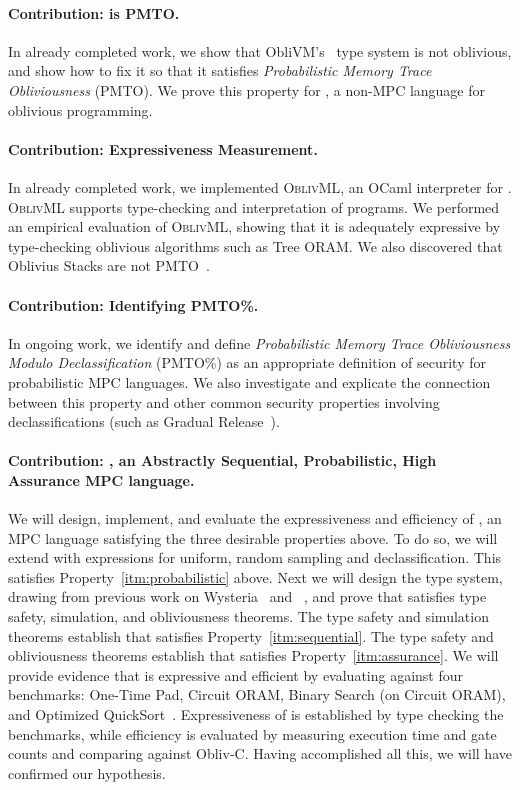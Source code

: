 \paragraph{Contribution: \obliv is PMTO.} In already completed work, we show that ObliVM's~\cite{oblivm} type system is not oblivious,
and show how to fix it so that it satisfies \emph{Probabilistic Memory Trace Obliviousness} (PMTO). We prove this property for \obliv,
a non-MPC language for oblivious programming.

\paragraph{Contribution: \obliv Expressiveness Measurement.} In already completed work, we implemented \textsc{OblivML}, an OCaml
interpreter for \obliv. \textsc{OblivML} supports type-checking and interpretation of \obliv programs. We performed an empirical
evaluation of \textsc{OblivML}, showing that it is adequately expressive by type-checking oblivious algorithms such as Tree ORAM.
We also discovered that Oblivius Stacks are not PMTO~\cite{sweet20odsnotpmto}.

\paragraph{Contribution: Identifying PMTO\%.} In ongoing work, we identify and define \emph{Probabilistic Memory Trace Obliviousness Modulo Declassification}
(PMTO\%) as an appropriate definition of security for probabilistic MPC languages. We also investigate and explicate the connection between
this property and other common security properties involving declassifications (such as Gradual Release~\cite{gradual-release}).

\paragraph{Contribution: \lang, an \textbf{Abstractly Sequential}, \textbf{Probabilistic}, \textbf{High Assurance} MPC language.}
We will design, implement, and evaluate the expressiveness and efficiency of \lang, an MPC language satisfying the three desirable
properties above. To do so, we will extend \mpc with expressions for uniform, random sampling and declassification. This satisfies
Property~\ref{itm:probabilistic} above. Next we will design the type system, drawing from previous work on Wysteria~\cite{rastogi14wysteria}
and \obliv~\cite{darais20obliv}, and prove that \lang satisfies type safety, simulation, and obliviousness theorems.
The type safety and simulation theorems establish that \lang satisfies Property~\ref{itm:sequential}. The type safety and obliviousness
theorems establish that \lang satisfies Property~\ref{itm:assurance}. We will provide evidence that \lang is expressive and efficient
by evaluating \lang against four benchmarks: One-Time Pad, Circuit ORAM, Binary Search (on Circuit ORAM), and Optimized QuickSort~\cite{obliv-quicksort}.
Expressiveness of \lang is established by type checking the benchmarks, while efficiency is evaluated by measuring execution time and
gate counts and comparing against Obliv-C. Having accomplished all this, we will have confirmed our hypothesis.

